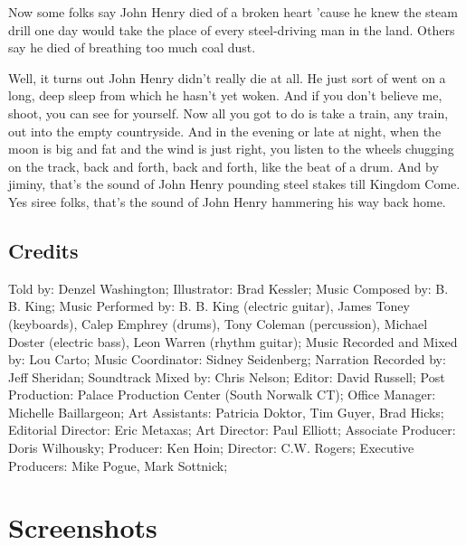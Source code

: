 Now some folks say John Henry died of a broken heart 'cause he knew the steam drill one day would take the place of every steel-driving man in the land. Others say he died of breathing too much coal dust.

Well, it turns out John Henry didn't really die at all. He just sort of went on a long, deep sleep from which he hasn't yet woken. And if you don't believe me, shoot, you can see for yourself. Now all you got to do is take a train, any train, out into the empty countryside. And in the evening or late at night, when the moon is big and fat and the wind is just right, you listen to the wheels chugging on the track, back and forth, back and forth, like the beat of a drum. And by jiminy, that's the sound of John Henry pounding steel stakes till Kingdom Come. Yes siree folks, that's the sound of John Henry hammering his way back home.

\subsection{Credits}

Told by: Denzel Washington;
Illustrator: Brad Kessler;
Music Composed by: B. B. King;
Music Performed by: B. B. King (electric guitar), James Toney (keyboards), Calep Emphrey (drums), Tony Coleman (percussion), Michael Doster (electric bass), Leon Warren (rhythm guitar);
Music Recorded and Mixed by: Lou Carto;
Music Coordinator: Sidney Seidenberg;
Narration Recorded by: Jeff Sheridan;
Soundtrack Mixed by: Chris Nelson;
Editor: David Russell;
Post Production: Palace Production Center (South Norwalk CT);
Office Manager: Michelle Baillargeon;
Art Assistants: Patricia Doktor, Tim Guyer, Brad Hicks;
Editorial Director: Eric Metaxas;
Art Director: Paul Elliott;
Associate Producer: Doris Wilhousky;
Producer: Ken Hoin;
Director: C.W. Rogers;
Executive Producers: Mike Pogue, Mark Sottnick;

\clearpage
\newpage

\section{Screenshots}

